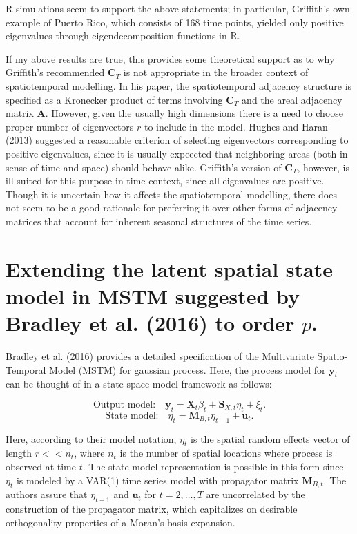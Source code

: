 \documentclass[12pt]{article}
\begin{document}
R simulations seem to support the above statements; in particular, Griffith's own example of Puerto Rico, which consists of 168 time points, yielded only positive eigenvalues through eigendecomposition functions in R.

If my above results are true, this provides some theoretical support as to why Griffith's recommended $\mathbf{C}_T$ is not appropriate in the broader context of spatiotemporal modelling. In his paper, the spatiotemporal adjacency structure is specified as a Kronecker product of terms involving $\mathbf{C}_T$ and the areal adjacency matrix $\mathbf{A}$. However, given the usually high dimensions there is a need to choose proper number of eigenvectors $r$ to include in the model. Hughes and Haran (2013) suggested a reasonable criterion of selecting eigenvectors corresponding to positive eigenvalues, since it is usually expeected that neighboring areas (both in sense of time and space) should behave alike. Griffith's version of $\mathbf{C}_T$, however, is ill-suited for this purpose in time context, since all eigenvalues are positive. Though it is uncertain how it affects the spatiotemporal modelling, there does not seem to be a good rationale for preferring it over other forms of adjacency matrices that account for inherent seasonal structures of the time series.

\section*{Extending the latent spatial state model in MSTM suggested by Bradley et al. (2016) to order $p$.}

Bradley et al. (2016) provides a detailed specification of the Multivariate Spatio-Temporal Model (MSTM) for gaussian process. Here, the process model for $\mathbf{y}_t$ can be thought of in a state-space model framework as follows:

$$\text{Output model:}\quad \mathbf{y}_t = \mathbf{X}_t\beta_t + \mathbf{S}_{X,t}\eta_t + \xi_t.$$
$$\text{State model:}\quad \eta_t = \mathbf{M}_{B,t}\eta_{t-1} + \mathbf{u}_t.$$

Here, according to their model notation, $\eta_t$ is the spatial random effects vector of length $r<<n_t$, where $n_t$ is the number of spatial locations where process is observed at time $t$. The state model representation is possible in this form since $\eta_t$ is modeled by a VAR(1) time series model with propagator matrix $\mathbf{M}_{B,t}$. The authors assure that $\eta_{t-1}$ and $\mathbf{u}_t$ for $t=2,\ldots,T$ are uncorrelated by the construction of the propagator matrix, which capitalizes on desirable orthogonality properties of a Moran's basis expansion.
\end{document}

